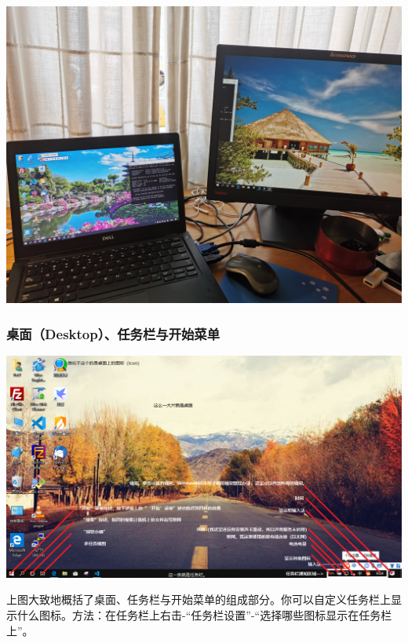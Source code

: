 \begin{center}
	\includegraphics[scale=0.1]{pic/ScrExtend}
\end{center} 
\subsubsection{桌面（Desktop）、任务栏与开始菜单}
\begin{center}
	\includegraphics[scale=0.35,angle=90]{pic/screenIntro}
\end{center} \par
上图大致地概括了桌面、任务栏与开始菜单的组成部分。你可以自定义任务栏上显示什么图标。方法：在任务栏上右击-“任务栏设置”-“选择哪些图标显示在任务栏上”。
